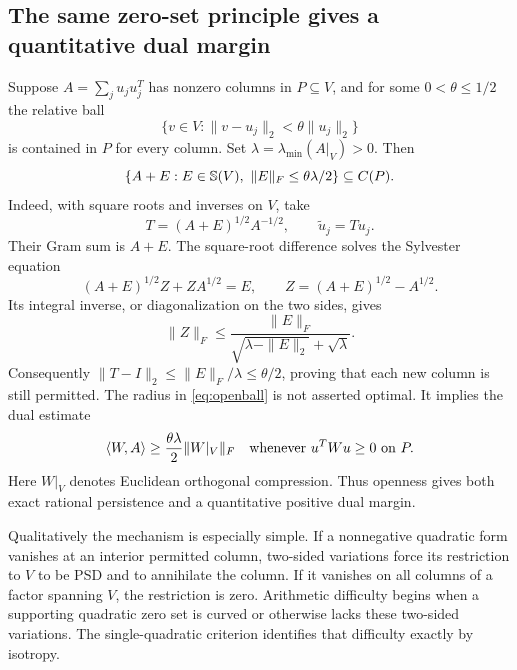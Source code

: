 \subsection{The same zero-set principle gives a quantitative dual margin}
Suppose $A=\sum_j u_ju_j^T$ has nonzero columns in $P\subseteq V$, and for some $0<\theta\leq1/2$ the relative ball
\[
 \{v\in V:\|v-u_j\|_2<\theta\|u_j\|_2\}
\]
is contained in $P$ for every column. Set $\lambda=\lambda_{\min}(A|_V)>0$. Then
\begin{equation}\label{eq:openball}
 \{A+E:E\in\mathbb S(V),\ \|E\|_F\leq\theta\lambda/2\}\subseteq C(P).
\end{equation}
Indeed, with square roots and inverses on $V$, take
\[
 T=(A+E)^{1/2}A^{-1/2},\qquad \widetilde u_j=Tu_j.
\]
Their Gram sum is $A+E$. The square-root difference solves the Sylvester equation
\[
 (A+E)^{1/2}Z+ZA^{1/2}=E,
 \qquad Z=(A+E)^{1/2}-A^{1/2}.
\]
Its integral inverse, or diagonalization on the two sides, gives
\[
 \|Z\|_F\leq\frac{\|E\|_F}{\sqrt{\lambda-\|E\|_2}+\sqrt\lambda}.
\]
Consequently $\|T-I\|_2\leq\|E\|_F/\lambda\leq\theta/2$, proving that each new column is still permitted. The radius in \eqref{eq:openball} is not asserted optimal. It implies the dual estimate
\[
 \langle W,A\rangle\geq\frac{\theta\lambda}{2}\|W|_V\|_F
 \quad\text{whenever }u^TWu\geq0\text{ on }P.
\]
Here $W|_V$ denotes Euclidean orthogonal compression. Thus openness gives both exact rational persistence and a quantitative positive dual margin.

Qualitatively the mechanism is especially simple. If a nonnegative quadratic form vanishes at an interior permitted column, two-sided variations force its restriction to $V$ to be PSD and to annihilate the column. If it vanishes on all columns of a factor spanning $V$, the restriction is zero. Arithmetic difficulty begins when a supporting quadratic zero set is curved or otherwise lacks these two-sided variations. The single-quadratic criterion identifies that difficulty exactly by isotropy.
